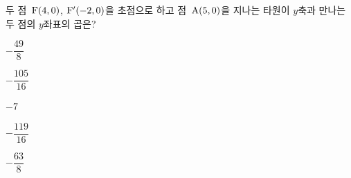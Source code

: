 두 점~$\mathrm{F}(4{,}\mkern3mu\mathopen{}0)$, $\mathrm{F}'(-2{,}\mkern3mu\mathopen{}0)$을 초점으로 하고 점~$\mathrm{A}(5{,}\mkern3mu\mathopen{}0)$을 지나는 타원이 $y$축과 만나는 두 점의 $y$좌표의 곱은?
\begin{choices32}{\rule[-3ex]{0pt}{8ex}$-\dfrac{49}{8}$}{\rule[-3ex]{0pt}{8ex}$-\dfrac{105}{16}$}{\rule[-3ex]{0pt}{8ex}$-7$}{\rule[-3ex]{0pt}{8ex}$-\dfrac{119}{16}$}{\rule[-3ex]{0pt}{8ex}$-\dfrac{63}{8}$}\end{choices32}
